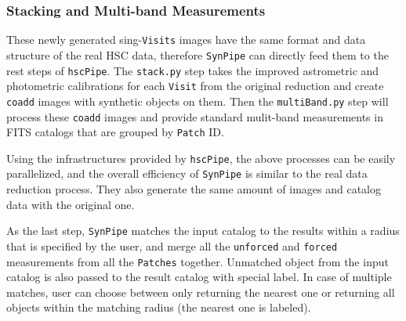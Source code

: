 \documentclass[useamsfonts]{pasj01}
\def\hscpipe{\texttt{hscPipe}}
\def\synpipe{\texttt{SynPipe}}
\def\forced{\texttt{forced}}
\def\unforced{\texttt{unforced}}
\def\visit{\texttt{Visit}}
\def\visits{\texttt{Visits}}
\begin{document}
\subsubsection{Stacking and Multi-band Measurements}
    \label{sssec:multiband}
         
    These newly generated sing-\visits{} images have the same format and data 
    structure of the real HSC data, therefore \synpipe{} can directly feed them 
    to the rest steps of \hscpipe{}. 
    The \texttt{stack.py} step takes the improved astrometric and photometric 
    calibrations for each \visit{} from the original reduction and create 
    \texttt{coadd} images with synthetic objects on them. 
    Then the \texttt{multiBand.py} step will process these \texttt{coadd} images and 
    provide standard mulit-band measurements in FITS catalogs that are grouped by 
    \texttt{Patch} ID. 

    Using the infrastructures provided by \hscpipe{}, the above processes can be 
    easily parallelized, and the overall efficiency of \synpipe{} is similar to the
    real data reduction process. 
    They also generate the same amount of images and catalog data with the original 
    one. 

    As the last step, \synpipe{} matches the input catalog to the results within a 
    radius that is specified by the user, and merge all the \unforced{} and 
    \forced{} measurements from all the \texttt{Patches} together. 
    Unmatched object from the input catalog is also passed to the result catalog with 
    special label. 
    In case of multiple matches, user can choose between only returning the nearest 
    one or returning all objects within the matching radius (the nearest one is 
    labeled).  
    
\end{document}
